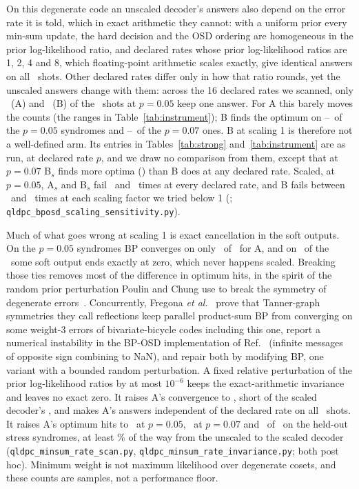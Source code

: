 \documentclass[aps,pra,twocolumn,superscriptaddress,nofootinbib,longbibliography,floatfix]{revtex4-2}
\begin{document}
On this degenerate code an unscaled decoder's answers also depend on the error rate it is told, which in exact arithmetic they cannot: with a uniform prior every min-sum update, the hard decision and the OSD ordering are homogeneous in the prior log-likelihood ratio, and declared rates whose prior log-likelihood ratios are 1, 2, 4 and 8, which floating-point arithmetic scales exactly, give identical answers on all \InvShots\ shots. Other declared rates differ only in how that ratio rounds, yet the unscaled answers change with them: across the 16 declared rates we scanned, only \InvOneAnswerA\ (A) and \InvOneAnswerB\ (B) of the \InvShots\ shots at $p=0.05$ keep one answer. For A this barely moves the counts (the ranges in Table~\ref{tab:instrument}); B finds the optimum on \ScanFiveBLo--\ScanFiveBHi\ of the $p=0.05$ syndromes and \ScanSevenBLo--\ScanSevenBHi\ of the $p=0.07$ ones. B at scaling 1 is therefore not a well-defined arm. Its entries in Tables~\ref{tab:strong} and~\ref{tab:instrument} are as run, at declared rate $p$, and we draw no comparison from them, except that at $p=0.07$ B$_s$ finds more optima (\ScanSevenBs) than B does at any declared rate. Scaled, at $p=0.05$, A$_s$ and B$_s$ fail \SensScaledFlatA\ and \SensScaledFlatB\ times at every declared rate, and B fails between \SensScaledMin\ and \SensScaledMax\ times at each scaling factor we tried below 1 (\SensAlphas; \texttt{qldpc\_bposd\_scaling\_sensitivity.py}).

Much of what goes wrong at scaling 1 is exact cancellation in the soft outputs. On the $p=0.05$ syndromes BP converges on only \ScanFiveConvA\ of \StrongShots\ for A, and on \ScanFiveZeroA\ of the \StrongShots\ some soft output ends exactly at zero, which never happens scaled. Breaking those ties removes most of the difference in optimum hits, in the spirit of the random prior perturbation Poulin and Chung use to break the symmetry of degenerate errors~\cite{poulin2008iterative}. Concurrently, Fregona \textit{et al.}~\cite{fregona2026dealing} prove that Tanner-graph symmetries they call reflections keep parallel product-sum BP from converging on some weight-3 errors of bivariate-bicycle codes including this one, report a numerical instability in the BP-OSD implementation of Ref.~\cite{roffe2020decoding} (infinite messages of opposite sign combining to NaN), and repair both by modifying BP, one variant with a bounded random perturbation. A fixed relative perturbation of the prior log-likelihood ratios by at most $10^{-6}$ keeps the exact-arithmetic invariance and leaves no exact zero. It raises A's convergence to \ScanFiveConvAj, short of the scaled decoder's \ScanFiveConvAs, and makes A's answers independent of the declared rate on all \InvShots\ shots. It raises A's optimum hits to \ScanFiveAj\ at $p=0.05$, \ScanSevenAj\ at $p=0.07$ and \ScanHoAj\ of \HoPostStressN\ on the held-out stress syndromes, at least \ScanJitterRecoveredMinPct\% of the way from the unscaled to the scaled decoder (\texttt{qldpc\_minsum\_rate\_scan.py}, \texttt{qldpc\_minsum\_rate\_invariance.py}; both post hoc). Minimum weight is not maximum likelihood over degenerate cosets, and these counts are samples, not a performance floor.
\end{document}
